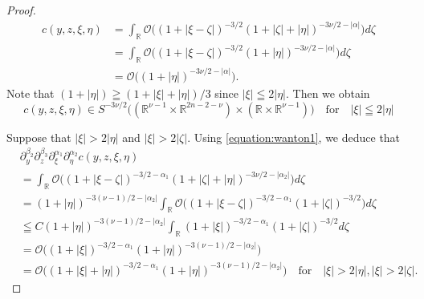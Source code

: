 \documentclass[a4paper,11pt,reqno]{amsart}
\numberwithin{equation}{section}
\theoremstyle{definition}
\theoremstyle{remark}
\begin{document}
\begin{proof}
\begin{align*}
  c(y,z,\xi,\eta)
& =
  \int_{\mathbb{R}}
  \mathcal{O}
  \bigl(
  (1+\lvert\xi-\zeta\rvert)^{-3/2}
  (1+\lvert\zeta\rvert+\lvert\eta\rvert)^{-3\nu/2-\lvert\alpha\rvert}
  \bigr)
  d\zeta
\\
& =
  \int_{\mathbb{R}}
  \mathcal{O}
  \bigl(
  (1+\lvert\xi-\zeta\rvert)^{-3/2}
  (1+\lvert\eta\rvert)^{-3\nu/2-\lvert\alpha\rvert}
  \bigr)
  d\zeta
\\
& =
  \mathcal{O}
  \bigl(
  (1+\lvert\eta\rvert)^{-3\nu/2-\lvert\alpha\rvert}
  \bigr). 
\end{align*}
%
%
Note that $(1+\lvert\eta\rvert)\geqq(1+\lvert\xi\rvert+\lvert\eta\rvert)/3$ 
since $\lvert\xi\rvert\leqq2\lvert\eta\rvert$. Then we obtain 
%
%
\begin{equation}
c(y,z,\xi,\eta)
\in 
S^{-3\nu/2}
\bigl(
(\mathbb{R}^{\nu-1}\times\mathbb{R}^{2n-2-\nu})
\times
(\mathbb{R}\times\mathbb{R}^{\nu-1})
\bigr) 
\quad
\text{for}
\quad
\lvert\xi\rvert\leqq2\lvert\eta\rvert
\label{equation:wanton3}
\end{equation}
%
%
\par
%
%
Suppose that $\lvert\xi\rvert>2\lvert\eta\rvert$ 
and $\lvert\xi\rvert>2\lvert\zeta\rvert$. 
Using \eqref{equation:wanton1}, we deduce that 
%
%
\begin{align}
&  \partial_y^{\beta_2}\partial_z^{\beta_3}\partial_\xi^{\alpha_1}\partial_\eta^{\alpha_2}
  c(y,z,\xi,\eta)
\nonumber
\\
& =
  \int_{\mathbb{R}}
  \mathcal{O}
  \bigl(
  (1+\lvert\xi-\zeta\rvert)^{-3/2-\alpha_1}
  (1+\lvert\zeta\rvert+\lvert\eta\rvert)^{-3\nu/2-\lvert\alpha_2\rvert}
  \bigr)
  d\zeta
\nonumber
\\
& =
  (1+\lvert\eta\rvert)^{-3(\nu-1)/2-\lvert\alpha_2\rvert}
  \int_{\mathbb{R}}
  \mathcal{O}
  \bigl(
  (1+\lvert\xi-\zeta\rvert)^{-3/2-\alpha_1}
  (1+\lvert\zeta\rvert)^{-3/2}
  \bigr)
  d\zeta
\nonumber
\\
& \leqq
  C
  (1+\lvert\eta\rvert)^{-3(\nu-1)/2-\lvert\alpha_2\rvert}
  \int_{\mathbb{R}}
  (1+\lvert\xi\rvert)^{-3/2-\alpha_1}
  (1+\lvert\zeta\rvert)^{-3/2}
  d\zeta
\nonumber
\\
& =
  \mathcal{O}
  \bigl(
  (1+\lvert\xi\rvert)^{-3/2-\alpha_1}  
  (1+\lvert\eta\rvert)^{-3(\nu-1)/2-\lvert\alpha_2\rvert}
  \bigr)
\nonumber
\\
& =
  \mathcal{O}
  \bigl(
  (1+\lvert\xi\rvert+\lvert\eta\rvert)^{-3/2-\alpha_1}  
  (1+\lvert\eta\rvert)^{-3(\nu-1)/2-\lvert\alpha_2\rvert}
  \bigr)
  \quad\text{for}\quad
  \lvert\xi\rvert>2\lvert\eta\rvert, 
  \lvert\xi\rvert>2\lvert\zeta\rvert. 

\end{align}
\end{proof}
\end{document}
